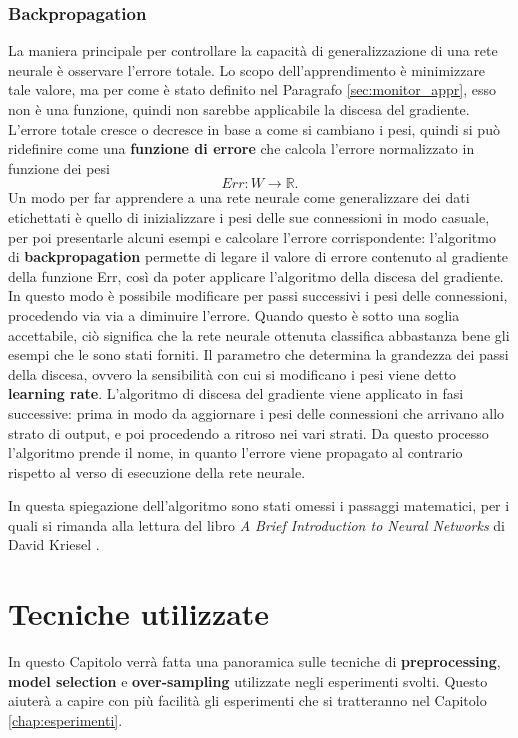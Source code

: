 \documentclass[12pt, twoside, letterpaper]{report}
\begin{document}
			\subsection{Backpropagation}
				La maniera principale per controllare la capacità di generalizzazione di una rete neurale è osservare l'errore totale. Lo scopo dell'apprendimento è minimizzare tale valore, ma per come è stato definito nel Paragrafo \ref{sec:monitor_appr}, esso non è una funzione, quindi non sarebbe applicabile la discesa del gradiente. L'errore totale cresce o decresce in base a come si cambiano i pesi, quindi si può ridefinire come una \textbf{funzione di errore} che calcola l'errore normalizzato in funzione dei pesi 
				$$Err : W \rightarrow \mathbb{R}.$$
				Un modo per far apprendere a una rete neurale come generalizzare dei dati etichettati è quello di inizializzare i pesi delle sue connessioni in modo casuale, per poi presentarle alcuni esempi e calcolare l'errore corrispondente: l'algoritmo di \textbf{backpropagation} permette di legare il valore di errore contenuto al gradiente della funzione Err, così da poter applicare l'algoritmo della discesa del gradiente. In questo modo è possibile modificare per passi successivi i pesi delle connessioni, procedendo via via a diminuire l'errore. Quando questo è sotto una soglia accettabile, ciò significa che la rete neurale ottenuta classifica abbastanza bene gli esempi che le sono stati forniti. Il parametro che determina la grandezza dei passi della discesa, ovvero la sensibilità con cui si modificano i pesi viene detto \textbf{learning rate}. L'algoritmo di discesa del gradiente viene applicato in fasi successive: prima in modo da aggiornare i pesi delle connessioni che arrivano allo strato di output, e poi procedendo a ritroso nei vari strati. Da questo processo l'algoritmo prende il nome, in quanto l'errore viene propagato al contrario rispetto al verso di esecuzione della rete neurale. 
				
				In questa spiegazione dell'algoritmo sono stati omessi i passaggi matematici, per i quali si rimanda alla lettura del libro \textit{A Brief Introduction to Neural Networks} di David Kriesel \cite{kriesel}.
				
	\chapter{Tecniche utilizzate}
		In questo Capitolo verrà fatta una panoramica sulle tecniche di \textbf{preprocessing}, \textbf{model selection} e \textbf{over-sampling} utilizzate negli esperimenti svolti. Questo aiuterà a capire con più facilità gli esperimenti che si tratteranno nel Capitolo \ref{chap:esperimenti}.
\end{document}
